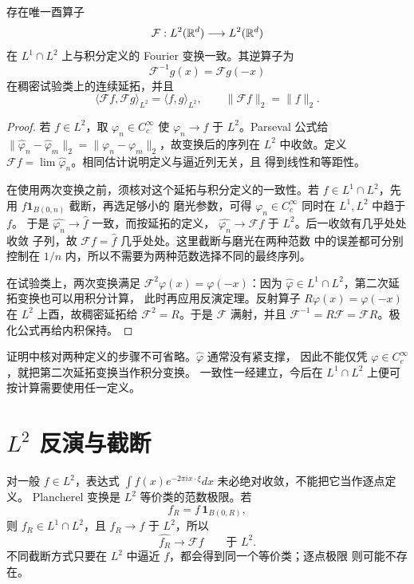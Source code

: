 \begin{theorem}[Plancherel 定理]\label{thm:plancherel}
存在唯一酉算子
\[
 \mathcal F:L^2(\mathbb{R}^d)\longrightarrow L^2(\mathbb{R}^d)
\]
在 \(L^1\cap L^2\) 上与积分定义的 Fourier 变换一致。其逆算子为
\[
 \mathcal F^{-1}g(x)=\mathcal Fg(-x)
\]
在稠密试验类上的连续延拓，并且
\[
 \langle\mathcal Ff,\mathcal Fg\rangle_{L^2}
 =\langle f,g\rangle_{L^2},\qquad
 \|\mathcal Ff\|_2=\|f\|_2.
\]
\end{theorem}
\begin{proof}
若 \(f\in L^2\)，取 \(\varphi_n\in C_c^\infty\) 使
\(\varphi_n\to f\) 于 \(L^2\)。Parseval 公式给
\(\|\widehat\varphi_n-\widehat\varphi_m\|_2
=\|\varphi_n-\varphi_m\|_2\)，故变换后的序列在 \(L^2\) 中收敛。定义
\(\mathcal Ff=\lim\widehat\varphi_n\)。相同估计说明定义与逼近列无关，且
得到线性和等距性。

在使用两次变换之前，须核对这个延拓与积分定义的一致性。若
\(f\in L^1\cap L^2\)，先用 \(f\mathbf1_{B(0,n)}\) 截断，再选足够小的
磨光参数，可得 \(\varphi_n\in C_c^\infty\) 同时在 \(L^1,L^2\) 中趋于 \(f\)。
于是 \(\widehat{\varphi_n}\to\widehat f\) 一致，而按延拓的定义，
\(\widehat{\varphi_n}\to\mathcal Ff\) 于 \(L^2\)。后一收敛有几乎处处收敛
子列，故 \(\mathcal Ff=\widehat f\) 几乎处处。这里截断与磨光在两种范数
中的误差都可分别控制在 \(1/n\) 内，所以不需要为两种范数选择不同的最终序列。

在试验类上，两次变换满足
\(\mathcal F^2\varphi(x)=\varphi(-x)\)：因为
\(\widehat\varphi\in L^1\cap L^2\)，第二次延拓变换也可以用积分计算，
此时再应用反演定理。反射算子
\(R\varphi(x)=\varphi(-x)\) 在 \(L^2\) 上酉，故稠密延拓给
\(\mathcal F^2=R\)。于是 \(\mathcal F\) 满射，并且
\(\mathcal F^{-1}=R\mathcal F=\mathcal FR\)。极化公式再给内积保持。
\end{proof}

证明中核对两种定义的步骤不可省略。\(\widehat\varphi\) 通常没有紧支撑，
因此不能仅凭 \(\varphi\in C_c^\infty\)，就把第二次延拓变换当作积分变换。
一致性一经建立，今后在 \(L^1\cap L^2\) 上便可按计算需要使用任一定义。

\section{\texorpdfstring{\(L^2\)}{L2} 反演与截断}

对一般 \(f\in L^2\)，表达式
\(\int f(x)e^{-2\pi ix\cdot\xi}dx\) 未必绝对收敛，不能把它当作逐点定义。
Plancherel 变换是 \(L^2\) 等价类的范数极限。若
\[
 f_R=f\,\mathbf1_{B(0,R)},
\]
则 \(f_R\in L^1\cap L^2\)，且 \(f_R\to f\) 于 \(L^2\)，所以
\[
 \widehat{f_R}\longrightarrow\mathcal Ff\qquad\text{于 }L^2.
\]
不同截断方式只要在 \(L^2\) 中逼近 \(f\)，都会得到同一个等价类；逐点极限
则可能不存在。

